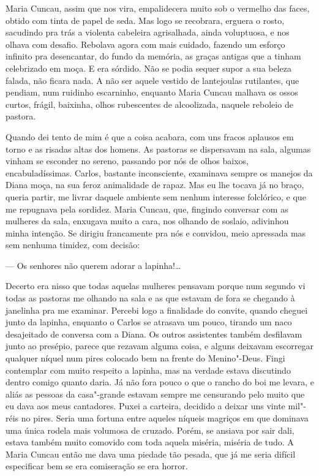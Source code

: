 \begin{linenumbers}
Maria Cuncau, assim que nos vira, empalidecera muito sob o vermelho das
faces, obtido com tinta de papel de seda. Mas logo se recobrara, erguera
o rosto, sacudindo pra trás a violenta cabeleira agrisalhada, ainda
voluptuosa, e nos olhava com desafio. Rebolava agora com mais cuidado,
fazendo um esforço infinito pra desencantar, do fundo da memória, as
graças antigas que a tinham celebrizado em moça. E era sórdido. Não se
podia sequer supor a sua beleza falada, não ficara nada. A não ser
aquele vestido de lantejoulas rutilantes, que pendiam, num ruidinho
escarninho, enquanto Maria Cuncau malhava os ossos curtos, frágil,
baixinha, olhos rubescentes de alcoolizada, naquele reboleio de pastora.

Quando dei tento de mim é que a coisa acabara, com uns fracos aplausos
em torno e as risadas altas dos homens. As pastoras se dispersavam na
sala, algumas vinham se esconder no sereno, passando por nós de olhos
baixos, encabuladíssimas. Carlos, bastante inconsciente, examinava
sempre os manejos da Diana moça, na sua feroz animalidade de rapaz. Mas
eu lhe tocava já no braço, queria partir, me livrar daquele ambiente sem
nenhum interesse folclórico, e que me repugnava pela sordidez. Maria
Cuncau, que, fingindo conversar com as mulheres da sala, enxugava muito
a cara, nos olhando de soslaio, adivinhou minha intenção. Se dirigiu
francamente pra nós e convidou, meio apressada mas sem nenhuma timidez,
com decisão:

--- Os senhores não querem adorar a lapinha!\ldots{}

Decerto era nisso que todas aquelas mulheres pensavam porque num segundo
vi todas as pastoras me olhando na sala e as que estavam de fora se
chegando à janelinha pra me examinar. Percebi logo a finalidade do
convite, quando cheguei junto da lapinha, enquanto o Carlos se atrasava
um pouco, tirando um naco desajeitado de conversa com a Diana. Os outros
assistentes também desfilavam junto ao presépio, parece que rezavam
alguma coisa, e alguns deixavam escorregar qualquer níquel num pires
colocado bem na frente do Menino"-Deus. Fingi contemplar com muito
respeito a lapinha, mas na verdade estava discutindo dentro comigo
quanto daria. Já não fora pouco o que o rancho do boi me levara, e aliás
as pessoas da casa"-grande estavam sempre me censurando pelo muito que eu
dava aos meus cantadores. Puxei a carteira, decidido a deixar uns vinte
mil"-réis no pires. Seria uma fortuna entre aqueles níqueis magriços em
que dominava uma única rodela mais volumosa de cruzado. Porém, se
ansiava por sair dali, estava também muito comovido com toda aquela
miséria, miséria de tudo. A Maria Cuncau então me dava uma piedade tão
pesada, que já me seria difícil especificar bem se era comiseração se
era horror.


\end{linenumbers}
